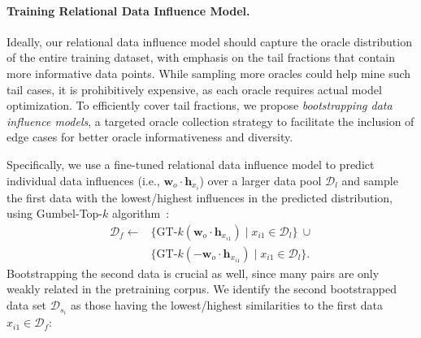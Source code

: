 \paragraph{Training Relational Data Influence Model.} 
Ideally, our relational data influence model should capture the oracle distribution of the entire training dataset, with emphasis on the tail fractions that contain more informative data points.
While sampling more oracles could help mine such tail cases, it is prohibitively expensive, as each oracle requires actual model optimization.
To efficiently cover tail fractions, we propose \textit{bootstrapping data influence models}, a targeted oracle collection strategy to facilitate the inclusion of edge cases for better oracle informativeness and diversity.

Specifically, we use a fine-tuned relational data influence model to predict individual data influences (i.e., $\textbf{w}_o\cdot\textbf{h}_{x_{i}}$) over a larger data pool $\mathcal{D}_l$ and sample the first data with the lowest/highest influences in the predicted distribution, using Gumbel-Top-$k$ algorithm~\cite{kool2019stochastic}:
\begin{align}
    \mathcal{D}_f \leftarrow &\{\text{GT-}k( \textbf{w}_o\cdot\textbf{h}_{x_{i1}}) \mid x_{i1} \in \mathcal{D}_l\}~\cup \nonumber \\
    &\{\text{GT-}k(-\textbf{w}_o\cdot\textbf{h}_{x_{i1}}) \mid x_{i1} \in \mathcal{D}_l\}.
\end{align}
Bootstrapping the second data is crucial as well, since many pairs are only weakly related in the pretraining corpus. We identify the second bootstrapped data set $\mathcal{D}_{s_i}$ as those having the lowest/highest similarities to the first data $x_{i1} \in \mathcal{D}_f$:

